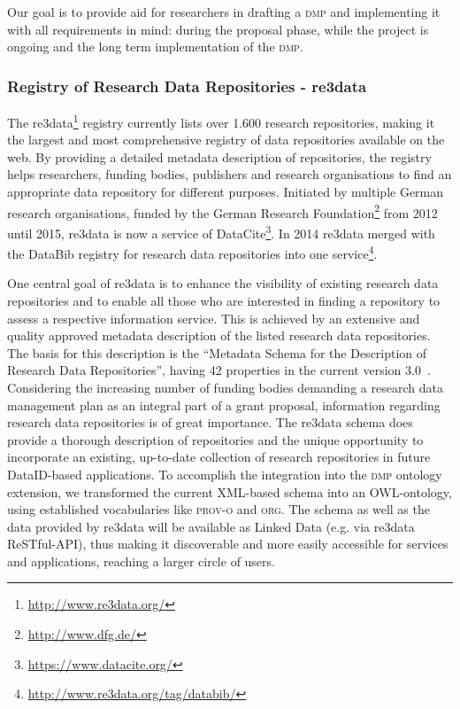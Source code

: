 \documentclass[runningheads,a4paper]{llncs}
\newcommand{\org}{{\scshape org}\xspace}
\newcommand{\prov}{{\scshape prov-o}\xspace}
\newcommand{\dmp}{{\scshape dmp}\xspace}
\newcommand\footnoteurl[1]{\footnote{\scriptsize\url{#1}}}
\begin{document}
Our goal is to provide aid for researchers in drafting a \dmp and implementing it with all requirements in mind: during the proposal phase, while the project is ongoing and the long term implementation of the \dmp.

\subsubsection{Registry of Research Data Repositories - re3data}
\label{requRe3}
The re3data\footnoteurl{http://www.re3data.org/} registry currently lists over 1.600 research repositories, making it the largest and most comprehensive registry of data repositories available on the web. By providing a detailed metadata description of repositories, the registry helps researchers, funding bodies, publishers and research organisations to find an appropriate data repository for different purposes\cite{PAMPLE2013}. Initiated by multiple German research organisations, funded by the German Research Foundation\footnoteurl{http://www.dfg.de/} from 2012 until 2015, re3data is now a service of DataCite\footnoteurl{https://www.datacite.org/}.
In 2014 re3data merged with the DataBib registry for research data repositories into one service\footnoteurl{http://www.re3data.org/tag/databib/}.


One central goal of re3data is to enhance the visibility of existing research data repositories and to enable all those who are interested in finding a repository to assess a respective information service. This is achieved by an extensive and quality approved metadata description of the listed research data repositories. The basis for this description is the “Metadata Schema for the Description of Research Data Repositories”, having 42 properties in the current version 3.0~\cite{r3dSchema}.
Considering the increasing number of funding bodies demanding a research data management plan as an integral part of a grant proposal, information regarding research data repositories is of great importance.
The re3data schema does provide a thorough description of repositories and the unique opportunity to incorporate an existing, up-to-date collection of research repositories in future DataID-based applications. To accomplish the integration into the \dmp ontology extension, we transformed the current XML-based schema into an OWL-ontology, using established vocabularies like \prov and \org. The schema as well as the data provided by re3data will be available as Linked Data (e.g. via re3data ReSTful-API), thus making it discoverable and more easily accessible for services and applications, reaching a larger circle of users.
\end{document}
